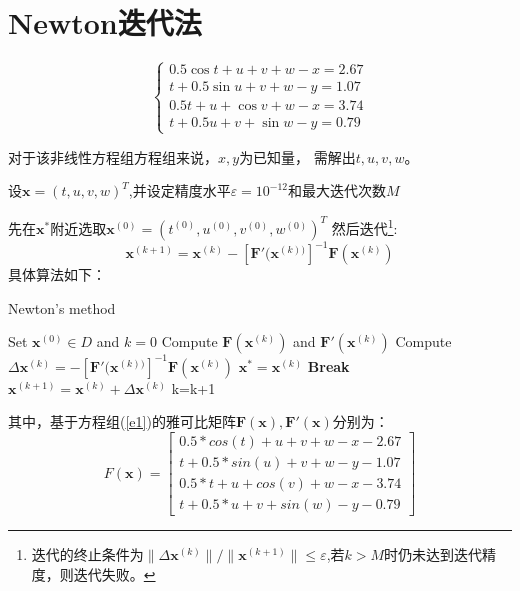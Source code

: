 \newpage
\section{Newton迭代法}
\label{sec:Newton}
\begin{equation}
\label{e1}
\left\{ \begin{array}{l}
0.5\cos t + u + v + w - x = 2.67\\
t + 0.5\sin u + v + w - y = 1.07\\
0.5t + u + \cos v + w - x = 3.74\\
t + 0.5u + v + \sin w - y = 0.79
\end{array} \right.
\end{equation}


对于该非线性方程组方程组来说，$x,y$为已知量，
需解出$t,u,v,w$。

设$\bm{x}= {(t,u,v,w)^T}$,并设定精度水平${\varepsilon } = {10^{ - 12}}$和最大迭代次数$M$

先在${\bm{x}^{\ast}}$附近选取${\bm{x}^{(0)}}= {({t^{(0)}},{u^{(0)}},{v^{(0)}},{w^{(0)}})^T}$
然后迭代\footnote{迭代的终止条件为$\|\Delta \bm{x}^{(k)}\|/\|\bm{x}^{(k+1)}\|\le \varepsilon$,若$k>M$时仍未达到迭代精度，则迭代失败。}:
\[\bm{x}^{(k+1)}= \bm{x}^{(k)}-[\bm{F}'(\bm{x}^{(k))}]^{-1}\bm{F}(\bm{x}^{(k)})\]
具体算法如下：
\begin{algorithm}[h]  
\caption{Newton's method}  
\begin{algorithmic}[1]  
\STATE Set $\bm{x}^{(0)}\in D$ and $k=0$
\STATE Compute $\bm{F}(\bm{x}^{(k)})$ 
and $\bm{F}'(\bm{x}^{(k)})$
\STATE Compute $\Delta \bm{x}^{(k)}=-[\bm{F}'(\bm{x}^{(k))}]^{-1}\bm{F}(\bm{x}^{(k)})$
\STATE $\bm{x}^{\ast}=\bm{x}^{(k)}$
\STATE \textbf{Break}
\ENDIF 
\STATE $\bm{x}^{(k+1)}= \bm{x}^{(k)}+
\Delta \bm{x}^{(k)}$
\STATE k=k+1
\ENDWHILE
\end{algorithmic}  
\end{algorithm}  

其中，基于方程组(\ref{e1})的雅可比矩阵$\bm{F}(\bm{x}),\bm{F}'(\bm{x})$分别为：
\[F(\bm{x}) = \left[ \begin{array}{l}
0.5*cos(t)  +  u  +  v  +  w  -  x  -  2.67\\
t  +  0.5*sin(u)  +  v  +  w  -  y  -  1.07\\
0.5*t  +  u  +  cos(v)  +  w  -  x  -  3.74\\
t  +  0.5*u  +  v  +  sin(w)  -  y  -  0.79
\end{array} \right]\]

